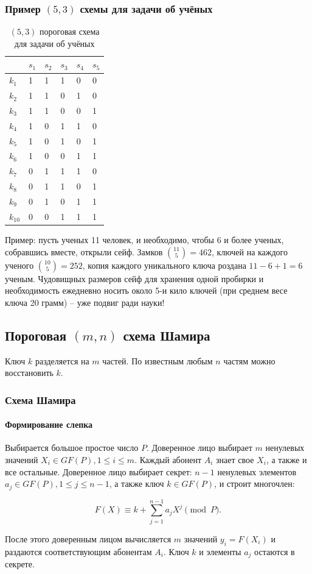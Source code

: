\begin{frame}
    \frametitle{Пример $(5,3)$ схемы для задачи об учёных}
    \begin{table}[ht]
        \caption{$(5,3)$ пороговая схема для задачи об учёных}\label{t:5to3scheme}
        \centering
        \begin{tabular}[c]{|l||l|l|l|l|l|}
            \hline
                  & $s_1$ & $s_2$ & $s_3$ & $s_4$ & $s_5$\\ \hline\hline 
            $k_1$ &1&1&1&0&0\\ \hline 
            $k_2$ &1&1&0&1&0\\ \hline 
            $k_3$ &1&1&0&0&1\\ \hline 
            $k_4$ &1&0&1&1&0\\ \hline 
            $k_5$ &1&0&1&0&1\\ \hline 
            $k_6$ &1&0&0&1&1\\ \hline 
            $k_7$ &0&1&1&1&0\\ \hline 
            $k_8$ &0&1&1&0&1\\ \hline 
            $k_9$ &0&1&0&1&1\\ \hline 
            $k_{10}$&0&0&1&1&1\\ \hline 
        \end{tabular}
    \end{table}
\end{frame}


Пример: пусть ученых 11 человек, и необходимо, чтобы 6 и более ученых, собравшись вместе, открыли сейф. Замков $\binom{11}{5}=462$, ключей на каждого ученого $\binom{10}{5}=252$, копия каждого уникального ключа роздана $11-6+1=6$ ученым. Чудовищных размеров сейф для хранения одной пробирки и необходимость ежедневно носить около 5-и кило ключей (при среднем весе ключа 20 грамм) – уже подвиг ради науки!


\subsection{Пороговая $(m,n)$ схема Шамира}

Ключ $k$ разделяется на $m$ частей. По известным любым $n$ частям можно восстановить $k$.

\begin{frame}
    \frametitle{Схема Шамира}
    \framesubtitle{Формирование слепка}
    
    Выбирается большое простое число $P$. Доверенное лицо выбирает $m$ ненулевых значений $X_i\in GF(P), 1\leq i\leq m$. Каждый абонент $A_i$ знает свое $X_i$, а также и все остальные. Доверенное лицо выбирает \alert{секрет}: $n-1$ ненулевых элементов $a_j\in GF(P),1 \leq j\leq n-1$, а также ключ $k\in GF(P)$, и строит многочлен:

    \[F(X)\equiv k+\sum_{j=1}^{n-1}a_jX^j\pmod{P}.\]

    После этого доверенным лицом вычисляется $m$ значений $y_i = F(X_i)$ и раздаются соответствующим абонентам $A_i$. Ключ $k$ и элементы $a_j$ остаются в секрете.
\end{frame}

